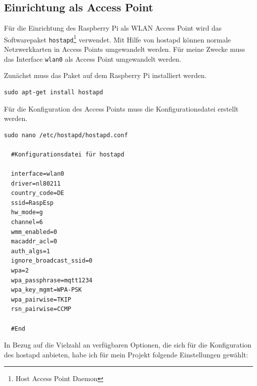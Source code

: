 \documentclass[12pt, letterpaper]{article}
\begin{document}
\subsection{Einrichtung als Access Point}
\par Für die Einrichtung des Raspberry Pi als WLAN Access Point wird das Softwarepaket \texttt{hostapd}\footnote[1]{Host Access Point Daemon} verwendet. Mit Hilfe von hostapd können normale Netzwerkkarten in Access Points umgewandelt werden. Für meine Zwecke muss das Interface \texttt{wlan0} als Access Point umgewandelt werden.
\par Zunächst muss das Paket auf dem Raspberry Pi installiert werden. 
\begin{Verbatim}[frame=single]
  sudo apt-get install hostapd
\end{Verbatim}
Für die Konfiguration des Access Points muss die Konfigurationsdatei  erstellt werden. 
\begin{Verbatim}[frame=single]
  sudo nano /etc/hostapd/hostapd.conf

  #Konfigurationsdatei für hostapd
  
  interface=wlan0
  driver=nl80211
  country_code=DE
  ssid=RaspEsp
  hw_mode=g
  channel=6
  wmm_enabled=0
  macaddr_acl=0
  auth_algs=1
  ignore_broadcast_ssid=0
  wpa=2
  wpa_passphrase=mqtt1234
  wpa_key_mgmt=WPA-PSK
  wpa_pairwise=TKIP
  rsn_pairwise=CCMP

  #End
\end{Verbatim}
\par In Bezug auf die Vielzahl an verfügbaren Optionen, die sich für die Konfiguration des hostapd anbieten, habe ich für mein Projekt folgende Einstellungen gewählt: 
\end{document}
